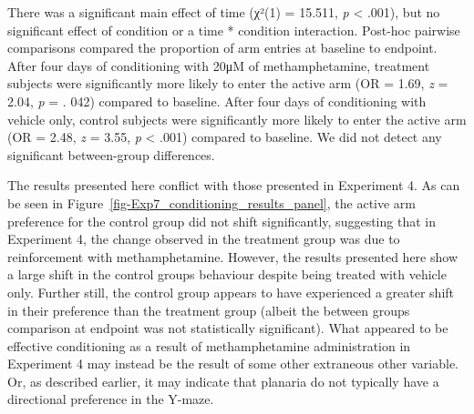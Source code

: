 \documentclass[
  jou,
  floatsintext,
  longtable,
  nolmodern,
  notxfonts,
  notimes,
  donotrepeattitle,
  colorlinks=true,linkcolor=blue,citecolor=blue,urlcolor=blue]{apa7}
\begin{document}
There was a significant main effect of time (χ²(1) = 15.511, \emph{p}
\textless{} .001), but no significant effect of condition or a time *
condition interaction. Post-hoc pairwise comparisons compared the
proportion of arm entries at baseline to endpoint. After four days of
conditioning with 20μM of methamphetamine, treatment subjects were
significantly more likely to enter the active arm (OR = 1.69, \emph{z} =
2.04, \emph{p} = . 042) compared to baseline. After four days of
conditioning with vehicle only, control subjects were significantly more
likely to enter the active arm (OR = 2.48, \emph{z} = 3.55, \emph{p}
\textless{} .001) compared to baseline. We did not detect any
significant between-group differences.

The results presented here conflict with those presented in Experiment
4. As can be seen in Figure~\ref{fig-Exp7_conditioning_results_panel},
the active arm preference for the control group did not shift
significantly, suggesting that in Experiment 4, the change observed in
the treatment group was due to reinforcement with methamphetamine.
However, the results presented here show a large shift in the control
groups behaviour despite being treated with vehicle only. Further still,
the control group appears to have experienced a greater shift in their
preference than the treatment group (albeit the between groups
comparison at endpoint was not statistically significant). What appeared
to be effective conditioning as a result of methamphetamine
administration in Experiment 4 may instead be the result of some other
extraneous other variable. Or, as described earlier, it may indicate
that planaria do not typically have a directional preference in the
Y-maze.
\end{document}
